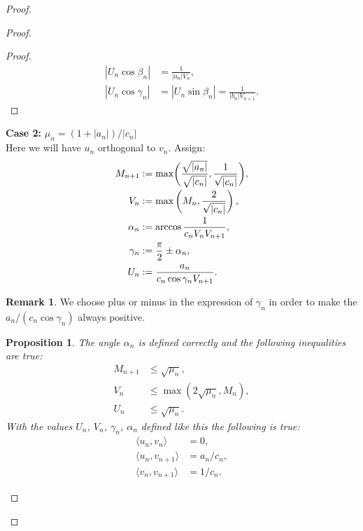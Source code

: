\documentclass[12pt]{article}
\newcommand\inner[2]{\langle #1, #2 \rangle}
\renewcommand{\leq}{\leqslant}
\newtheorem{prop}{Proposition}
\theoremstyle{definition}
\newtheorem*{remark*}{Remark}
\numberwithin{remark}{section}
\numberwithin{theorem}{section}
\numberwithin{prop}{section}
\numberwithin{equation}{section}
\numberwithin{lemma}{section}
\numberwithin{prop_under_lemma}{lemma}
\begin{document}
\begin{proof}
\begin{proof}
\begin{proof}
\begin{align*}
                        |U_n \cos{\beta_n}| &= \frac{1}{|a_n|V_n},\\
                        \left|U_n \cos{\gamma_n}\right| &= \left|U_n \sin{\beta_n}\right| = \frac{1}{|b_n|V_{n+1}}.
                    \end{align*}
                \end{proof}
            \noindent\textbf{Case 2:} $\mu_n = (1 + |a_n|)/|c_n|$\\
                Here we will have $u_n$ orthogonal to $v_n$.
                Assign:
                \begin{align*}
                    M_{n+1} &:= \max\biggl(\smash[b]{\frac{\sqrt{|a_n|}}{\sqrt{|c_n|}}}, \frac{1}{\sqrt{\smash[b]{|c_n|}}}\biggr),\\
                    V_n &:= \max\left(M_n, \frac{2}{\sqrt{\smash[b]{|c_n|}}}\right),\\
                    \alpha_n &:= \arccos{\frac{1}{c_n V_n V_{n+1}}},\\
                    \gamma_n &:= \frac{\pi}{2} \pm \alpha_n,\\
                    U_n &:= \frac{a_n}{c_n \cos{\gamma_n} V_{n+1}}.
                \end{align*}
                \begin{remark*}
                    We choose plus or minus in the expression of $\gamma_n$ in order to make the $a_n/(c_n \cos{\gamma_n})$ always positive.
                \end{remark*}
                \begin{prop}
                    The angle $\alpha_n$ is defined correctly and the following inequalities are true:
                    \begin{align*}
                        M_{n+1} &\leq \sqrt{\mu_n},\\
                        V_n &\leq \max(2\sqrt{\mu_n}, M_n),\\
                        U_n &\leq \sqrt{\mu_n}.
                    \end{align*}
                    With the values $U_n$, $V_n$, $\gamma_n$, $\alpha_n$ defined like this the following is true:
                    \begin{align*}
                        \inner{u_n}{v_n} &= 0,\\
                        \inner{u_n}{v_{n+1}} &= a_n/c_n,\\
                        \inner{v_n}{v_{n+1}} &= 1/c_n.
                    \end{align*}

\end{prop}
\end{proof}
\end{proof}
\end{document}
